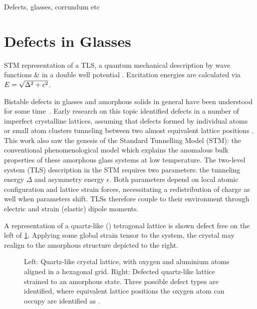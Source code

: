 Defects, glasses, corrundum etc







\section{Defects in Glasses}
\begin{marginfigure}
\resizebox{\marginparwidth}{!}{}
\caption[STM Picture of a TLS]{STM representation of a TLS, a quantum mechanical description by wave functions  \&  in a double well potential . Excitation energies are calculated via $\cramped{E = \sqrt{\Delta^2+\epsilon^2}}$. }
\end{marginfigure}
Bistable defects in glasses and amorphous solids in general have been understood for some time~\cite{Zachariasen1932,Anderson1972}.
Early research on this topic identified defects in a number of imperfect crystalline lattices, assuming that defects formed by individual atoms or small atom clusters tunneling between two almost equivalent lattice positions \cite{Anderson1972,Phillips1972}.
This work also saw the genesis of the Standard Tunnelling Model (STM): the conventional phenomenological  model which explains the anomalous bulk properties of these amorphous glass systems at low temperature.
The two-level system (TLS) description in the STM requires two parameters: the tunneling energy $\Delta$ and asymmetry energy $\epsilon$.
Both parameters depend on local atomic configuration and lattice strain forces, necessitating a redistribution of charge as well when parameters shift.
TLSs therefore couple to their environment through electric and strain (elastic) dipole moments.

A representation of a quartz-like () tetragonal lattice is shown defect free on the left of \cref{fig:sio2}.
Applying some global strain tensor to the system, the crystal may realign to the amorphous structure depicted to the right.
\begin{figure}[htp]
\widefiguremargins
\begin{adjustwidth}{\leftwidth}{\rightwidth}
\resizebox{\widefigure}{!}{}
\caption[Quartz-like Crystal Lattice, Pure and Defected]{\label{fig:sio2}Left: Quartz-like crystal lattice, with oxygen \resizebox{!}{0.6em}{} and aluminium \resizebox{!}{0.6em}{} atoms aligned in a hexagonal grid. Right: Defected quartz-like lattice strained to an amorphous state. Three possible defect types are identified, where equivalent lattice positions the oxygen atom can occupy are identified as \resizebox{!}{0.6em}{}.}
\end{adjustwidth}
\end{figure}


